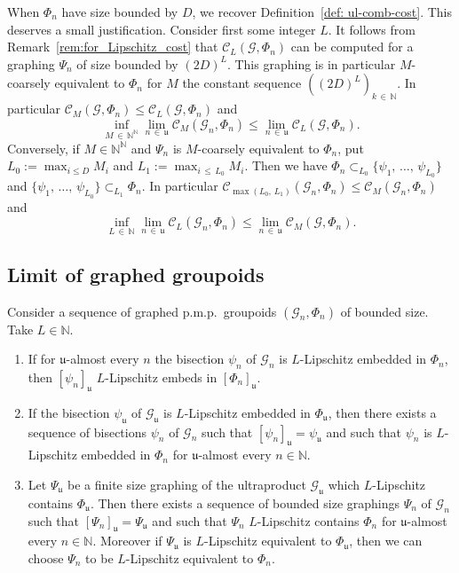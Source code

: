 \documentclass[AHL,Unicode,longabstracts,published]{cedram}
\newcommand{\Nmath}{\mathbb{N}}
\newcommand{\cost}{\mathcal{C}}
\newcommand{\cg}{\mathcal{G}}
\newcommand{\ul}{\mathfrak{u}}
\newcommand{\pmp}{p.m.p.\ }
\newcommand*{\romanenumi}{\renewcommand*{\theenumi}{\roman{enumi}}}
\begin{document}
When $\Phi_n$ have size bounded by $D$, we recover Definition~\ref{def: ul-comb-cost}. This deserves a small justification. Consider first some integer $L$. It follows from Remark~\ref{rem:for_Lipschitz_cost} that $\cost_{L}(\cg,\Phi_n)$ can be computed for a graphing $\Psi_n$ of size bounded by $(2D)^{L}$. This graphing is in particular $M$-coarsely equivalent to $\Phi_n$ for $M$ the constant sequence $((2D)^L)_{k\, \in\,\Nmath}$. In particular $\cost_M(\cg,\Phi_n) \leq \cost_{L}(\cg,\Phi_n)$ and
\[
\inf_{M\,\in\,\Nmath^\Nmath} \lim_{n\,\in\,\ul}\cost_M(\cg_n,\Phi_n) \leq \lim_{n\,\in\,\ul} \cost_{L}(\cg,\Phi_n).
\]
Conversely, if $M \in \Nmath^\Nmath$ and $\Psi_n$ is $M$-coarsely equivalent to $\Phi_n$, put $L_0 := \max_{i \leq D} M_i$ and $L_1:=\max_{i\,\leq\,L_0} M_i$. Then we have $\Phi_n \subset_{L_0} \{\psi_1,\,\dots,\,\psi_{L_0}\}$ and $\{\psi_1,\,\dots,\,\psi_{L_0}\} \subset_{L_1} \Phi_n$. In particular $\cost_{\max(L_0,\,L_1)}(\cg_n,\Phi_n) \leq \cost_M(\cg_n,\Phi_n)$ and
\[
\inf_{L\,\in\,\Nmath} \lim_{n\,\in\,\ul}\cost_L(\cg_n,\Phi_n) \leq \lim_{n\,\in\,\ul} \cost_{M}(\cg,\Phi_n).
\]


\subsection{Limit of graphed groupoids}

\begin{prop}\label{prop:compar}
Consider a sequence of graphed \pmp groupoids $(\cg_n,\Phi_n)$ of bounded size. Take $L\in\Nmath$.
\begin{enumerate}\romanenumi
\item \label{item: limit of L-Lip embedd gr are L-Lip embedd}
If for $\ul$-almost every $n$ the bisection $\psi_n$ of $\cg_n$ is $L$-Lipschitz embedded in $\Phi_n$, then $[\psi_n]_\ul$ $L$-Lipschitz embeds in $[\Phi_n]_\ul$.

\item \label{prop3.12.2}If the bisection $\psi_\ul$ of $\cg_\ul$ is $L$-Lipschitz embedded in $\Phi_\ul$, then there exists a sequence of bisections $\psi_n$ of $\cg_n$ such that $[\psi_n]_\ul=\psi_{\ul}$ and such that $\psi_n$ is $L$-Lipschitz embedded in $\Phi_n$ for $\ul$-almost every $n\in \Nmath$.

\item \label{prop3.12.3}Let $\Psi_\ul$ be a finite size graphing of the ultraproduct $\cg_\ul$ which $L$-Lipschitz contains $\Phi_\ul$. Then there exists a sequence of bounded size graphings $\Psi_n$ of $\cg_n$ such that $[\Psi_n]_\ul=\Psi_{\ul}$ and such that $\Psi_n$ $L$-Lipschitz contains $\Phi_n$ for $\ul$-almost every $n\in \Nmath$. Moreover if $\Psi_\ul$ is $L$-Lipschitz equivalent to $\Phi_\ul$, then we can choose $\Psi_n$ to be $L$-Lipschitz equivalent to $\Phi_n$.
\end{enumerate}
\end{prop}
\end{document}
